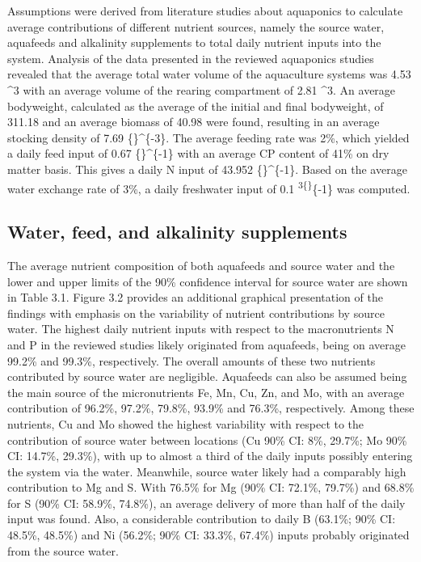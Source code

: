 \documentclass[preprint, 3p,
authoryear]{elsarticle} %
\begin{document}
Assumptions were derived from literature studies about aquaponics to
calculate average contributions of different nutrient sources, namely
the source water, aquafeeds and alkalinity supplements to total daily
nutrient inputs into the system. Analysis of the data presented in the
reviewed aquaponics studies revealed that the average total water volume
of the aquaculture systems was 4.53 \^{}3 with an average
volume of the rearing compartment of 2.81 \^{}3. An average
bodyweight, calculated as the average of the initial and final
bodyweight, of 311.18  and an average biomass of 40.98
 were found, resulting in an average stocking density of 7.69
\{\}\^{}\{-3\}. The average feeding rate was 2\%, which
yielded a daily feed input of 0.67 \{\}\^{}\{-1\} with an
average CP content of 41\% on dry matter basis. This gives a daily N
input of 43.952 \{\}\^{}\{-1\}. Based on the average water
exchange rate of 3\%, a daily freshwater input of 0.1
\textsuperscript{3\{\}}\{-1\} was computed.

\hypertarget{water-feed-and-alkalinity-supplements}{%
\subsection{Water, feed, and alkalinity
supplements}\label{water-feed-and-alkalinity-supplements}}

The average nutrient composition of both aquafeeds and source water and
the lower and upper limits of the 90\% confidence interval for source
water are shown in Table 3.1. Figure 3.2 provides an additional
graphical presentation of the findings with emphasis on the variability
of nutrient contributions by source water. The highest daily nutrient
inputs with respect to the macronutrients N and P in the reviewed
studies likely originated from aquafeeds, being on average 99.2\% and
99.3\%, respectively. The overall amounts of these two nutrients
contributed by source water are negligible. Aquafeeds can also be
assumed being the main source of the micronutrients Fe, Mn, Cu, Zn, and
Mo, with an average contribution of 96.2\%, 97.2\%, 79.8\%, 93.9\% and
76.3\%, respectively. Among these nutrients, Cu and Mo showed the
highest variability with respect to the contribution of source water
between locations (Cu 90\% CI: 8\%, 29.7\%; Mo 90\% CI: 14.7\%, 29.3\%),
with up to almost a third of the daily inputs possibly entering the
system via the water. Meanwhile, source water likely had a comparably
high contribution to Mg and S. With 76.5\% for Mg (90\% CI: 72.1\%,
79.7\%) and 68.8\% for S (90\% CI: 58.9\%, 74.8\%), an average delivery
of more than half of the daily input was found. Also, a considerable
contribution to daily B (63.1\%; 90\% CI: 48.5\%, 48.5\%) and Ni
(56.2\%; 90\% CI: 33.3\%, 67.4\%) inputs probably originated from the
source water.
\end{document}
